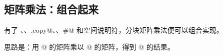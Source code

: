 \subsection*{矩阵乘法：组合起来}

有了 \co@parallel@、\co@foreach@、\co@dma.copy@、\co@chunkat@、\co@#@ 和空间说明符，分块矩阵乘法便可以组合实现。

思路是：用 \co@[128, 256]@ 的矩阵乘以 \co@[256, 256]@ 的矩阵，得到 \co@[128, 256]@ 的结果。
